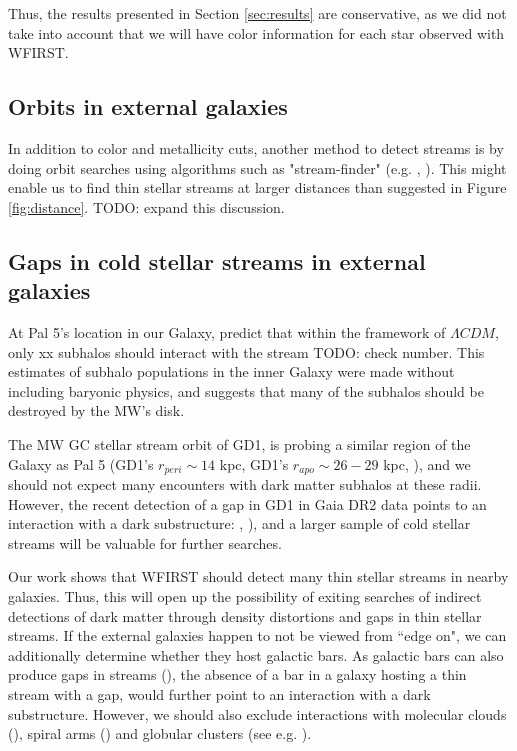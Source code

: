 \documentclass[twocolumn]{aastex62}
\newcommand{\todo}[1]{{\color{red} TODO: #1}}
\begin{document}
Thus, the results presented in Section \ref{sec:results} are conservative, as we did not take into account that we will have color information for each star observed with WFIRST. 


\subsection{Orbits in external galaxies}
In addition to color and metallicity cuts, another method to detect streams is by doing orbit searches using algorithms such as "stream-finder" (e.g. \citealt{malhan18}, \citealt{ibata19}). This might enable us to find thin stellar streams at larger distances than suggested in Figure \ref{fig:distance}. \todo{expand this discussion.}




\subsection{Gaps in cold stellar streams in external galaxies}
 At Pal 5's location in our Galaxy, \citet{bovy17} predict that within the framework of $\Lambda CDM$, only xx subhalos should interact with the stream \todo{check number}. This estimates of subhalo populations in the inner Galaxy were made without including baryonic physics, and \citet{garrison17} suggests that many of the subhalos should be destroyed by the MW's disk. 
 
The MW GC stellar stream orbit of GD1, is probing a similar region of the Galaxy as Pal 5 (GD1's $r_{peri} \sim 14$ kpc, GD1's $r_{apo} \sim 26-29$ kpc, \citealt{koposov10}), and we should not expect many encounters with dark matter subhalos at these radii. However, the recent detection of a gap in GD1 in Gaia DR2 data points to an interaction with a dark substructure: \citealt{price18}, \citealt{bonaca19}), and a larger sample of cold stellar streams will be valuable for further searches.  
 
Our work shows that WFIRST should detect many thin stellar streams in nearby galaxies. Thus, this will open up the possibility of exiting searches of indirect detections of dark matter through density distortions and gaps in thin stellar streams. If the external galaxies happen to not be viewed from ``edge on", we can additionally determine whether they host galactic bars. As galactic bars can also produce gaps in streams (\citealt{pearson17}), the absence of a bar in a galaxy hosting a thin stream with a gap, would further point to an interaction with a dark substructure. However, we should also exclude interactions with molecular clouds (\citealt{amorisco16}), spiral arms (\citealt{banik19}) and globular clusters (see e.g. \citealt{bonaca19}).
\end{document}
